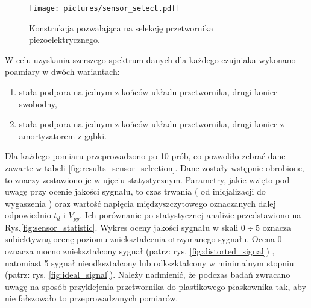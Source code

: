 \begin{figure}[tbhp]
\centering
\texttt{[image: pictures/sensor\_select.pdf]}
\caption{Konstrukcja pozwalająca na selekcję przetwornika piezoelektrycznego.}
\label{fig:sensor_sel_geometry}
\end{figure}

\pagebreak 
W celu uzyskania szerszego spektrum danych dla każdego czujniaka wykonano
poamiary w dwóch wariantach: 
\begin{enumerate}
\item stała podpora na jednym z końców układu przetwornika, drugi koniec swobodny,\nopagebreak
\item stała podpora na jednym z końców układu przetwornika, drugi koniec z 
amortyzatorem z gąbki.
\end{enumerate}

Dla każdego pomiaru przeprowadzono po 10 prób, co pozwoliło zebrać dane zawarte w tabeli
\ref{fig:results_sensor_selection}. Dane zostały wstępnie obrobione, to znaczy zestawiono
je w ujęciu statystycznym.
Parametry, jakie wzięto pod uwagę przy ocenie jakości sygnału, to czas trwania 
( od inicjalizacji do wygaszenia ) oraz wartość napięcia międzyszczytowego oznaczanych 
dalej odpowiednio $t_d$ i $V_{pp}$. Ich porównanie po statystycznej analizie 
przedstawiono na Rys.\ref{fig:sensor_statistic}. Wykres oceny jakości sygnału w skali $0\div5$ 
oznacza subiektywną ocenę poziomu zniekształcenia otrzymanego sygnału. Ocena 0 oznacza mocno
zniekształcony sygnał (patrz: rys. \ref{fig:distorted_signal}) , natomiast 5 sygnał nieodkształcony 
lub odkszktałcony w minimalnym stopniu (patrz: rys. \ref{fig:ideal_signal}). 
Należy nadmienić, że podczas badań zwracano uwagę na sposób przyklejenia przetwornika do plastikowego 
płaskownika tak, aby nie fałszowało to przeprowadzanych pomiarów. 


\sensorSelTab


